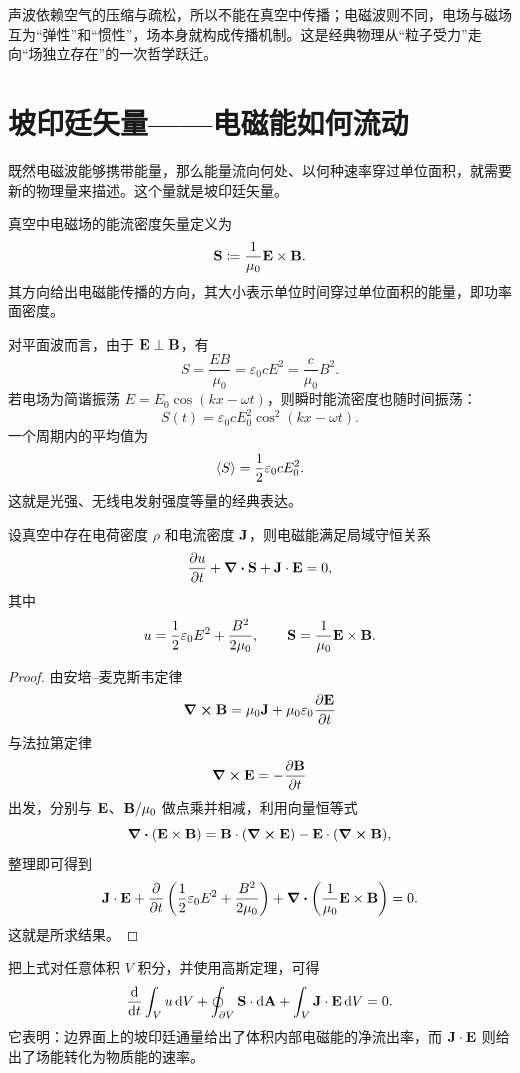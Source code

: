 \begin{remark}
声波依赖空气的压缩与疏松，所以不能在真空中传播；电磁波则不同，电场与磁场互为“弹性”和“惯性”，场本身就构成传播机制。这是经典物理从“粒子受力”走向“场独立存在”的一次哲学跃迁。
\end{remark}

\section{坡印廷矢量——电磁能如何流动}

既然电磁波能够携带能量，那么能量流向何处、以何种速率穿过单位面积，就需要新的物理量来描述。这个量就是坡印廷矢量。

\begin{definition}[坡印廷矢量]
真空中电磁场的能流密度矢量定义为
\[
\vb{S}\coloneqq \frac{1}{\mu_0}\vb{E}\times\vb{B}.
\]
其方向给出电磁能传播的方向，其大小表示单位时间穿过单位面积的能量，即功率面密度。
\end{definition}

对平面波而言，由于 $\vb{E}\perp\vb{B}$，有
\[
S=\frac{EB}{\mu_0}=\varepsilon_0 c E^2=\frac{c}{\mu_0}B^2.
\]
若电场为简谐振荡 $E=E_0\cos(kx-\omega t)$，则瞬时能流密度也随时间振荡：
\[
S(t)=\varepsilon_0 c E_0^2 \cos^2(kx-\omega t).
\]
一个周期内的平均值为
\[
\langle S \rangle=\frac{1}{2}\varepsilon_0 c E_0^2.
\]
这就是光强、无线电发射强度等量的经典表达。

\begin{theorem}[坡印廷定理的真空形式]
设真空中存在电荷密度 $\rho$ 和电流密度 $\vb{J}$，则电磁能满足局域守恒关系
\[
\pdv{u}{t}+\div \vb{S}+\vb{J}\cdot\vb{E}=0,
\]
其中
\[
 u=\frac{1}{2}\varepsilon_0 E^2+\frac{B^2}{2\mu_0},
 \qquad
 \vb{S}=\frac{1}{\mu_0}\vb{E}\times\vb{B}.
\]
\end{theorem}

\begin{proof}
由安培--麦克斯韦定律
\[
\curl\vb{B}=\mu_0\vb{J}+\mu_0\varepsilon_0\pdv{\vb{E}}{t}
\]
与法拉第定律
\[
\curl\vb{E}=-\pdv{\vb{B}}{t}
\]
出发，分别与 $\vb{E}$、$\vb{B}/\mu_0$ 做点乘并相减，利用向量恒等式
\[
\div(\vb{E}\times\vb{B})=\vb{B}\cdot(\curl\vb{E})-\vb{E}\cdot(\curl\vb{B}),
\]
整理即可得到
\[
\vb{J}\cdot\vb{E}+\pdv{}{t}\left(\frac{1}{2}\varepsilon_0 E^2+\frac{B^2}{2\mu_0}\right)+\div\left(\frac{1}{\mu_0}\vb{E}\times\vb{B}\right)=0.
\]
这就是所求结果。
\end{proof}

把上式对任意体积 $V$ 积分，并使用高斯定理，可得
\[
\dv{}{t}\int_V u\,\dd V+\oint_{\partial V}\vb{S}\cdot\dd\vb{A}+\int_V \vb{J}\cdot\vb{E}\,\dd V=0.
\]
它表明：边界面上的坡印廷通量给出了体积内部电磁能的净流出率，而 $\vb{J}\cdot\vb{E}$ 则给出了场能转化为物质能的速率。

